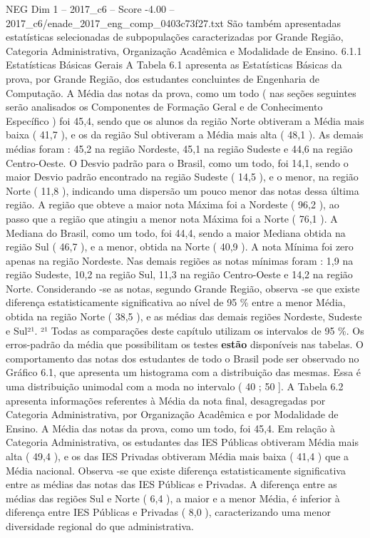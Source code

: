 \begin{textsample}{NEG Dim 1 – 2017\_c6 – Score -4.00 – 2017\_c6/enade\_2017\_eng\_comp\_0403c73f27.txt}
São também apresentadas estatísticas selecionadas de subpopulações caracterizadas por Grande Região, Categoria Administrativa, Organização Acadêmica e Modalidade de Ensino. 6.1.1 Estatísticas Básicas Gerais A Tabela 6.1 apresenta as Estatísticas Básicas da prova, por Grande Região, dos estudantes concluintes de Engenharia de Computação.
A Média das notas da prova, como um todo ( nas seções seguintes serão analisados os Componentes de Formação Geral e de Conhecimento Específico ) foi 45,4, sendo que os alunos da região Norte obtiveram a Média mais baixa ( 41,7 ), e os da região Sul obtiveram a Média mais alta ( 48,1 ).
As demais médias foram : 45,2 na região Nordeste, 45,1 na região Sudeste e 44,6 na região Centro-Oeste.
O Desvio padrão para o Brasil, como um todo, foi 14,1, sendo o maior Desvio padrão encontrado na região Sudeste ( 14,5 ), e o menor, na região Norte ( 11,8 ), indicando uma dispersão um pouco menor das notas dessa última região.
A região que obteve a maior nota Máxima foi a Nordeste ( 96,2 ), ao passo que a região que atingiu a menor nota Máxima foi a Norte ( 76,1 ).
A Mediana do Brasil, como um todo, foi 44,4, sendo a maior Mediana obtida na região Sul ( 46,7 ), e a menor, obtida na Norte ( 40,9 ).
A nota Mínima foi zero apenas na região Nordeste.
Nas demais regiões as notas mínimas foram : 1,9 na região Sudeste, 10,2 na região Sul, 11,3 na região Centro-Oeste e 14,2 na região Norte.
Considerando -se as notas, segundo Grande Região, observa -se que existe diferença estatisticamente significativa ao nível de 95 \% entre a menor Média, obtida na região Norte ( 38,5 ), e as médias das demais regiões Nordeste, Sudeste e Sul²¹. ²¹ Todas as comparações deste capítulo utilizam os intervalos de 95 \%.
Os erros-padrão da média que possibilitam os testes \textbf{estão} disponíveis nas tabelas.
O comportamento das notas dos estudantes de todo o Brasil pode ser observado no Gráfico 6.1, que apresenta um histograma com a distribuição das mesmas.
Essa é uma distribuição unimodal com a moda no intervalo ( 40 ; 50 ].
A Tabela 6.2 apresenta informações referentes à Média da nota final, desagregadas por Categoria Administrativa, por Organização Acadêmica e por Modalidade de Ensino.
A Média das notas da prova, como um todo, foi 45,4.
Em relação à Categoria Administrativa, os estudantes das IES Públicas obtiveram Média mais alta ( 49,4 ), e os das IES Privadas obtiveram Média mais baixa ( 41,4 ) que a Média nacional.
Observa -se que existe diferença estatisticamente significativa entre as médias das notas das IES Públicas e Privadas.
A diferença entre as médias das regiões Sul e Norte ( 6,4 ), a maior e a menor Média, é inferior à diferença entre IES Públicas e Privadas ( 8,0 ), caracterizando uma menor diversidade regional do que administrativa.

\end{textsample}
